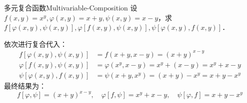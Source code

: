 \begin{problem}{多元复合函数}{Multivariable-Composition}
    设 $f(x, y) = x^y, \varphi(x, y) = x + y, \psi(x, y) = x - y$，求 $f[\varphi(x, y), \psi(x, y)], \varphi[f(x, y), \psi(x, y)], \psi[\varphi(x, y), f(x, y)]$．
\end{problem}

\begin{solution}
    依次进行复合代入：
    \begin{equation}
        \begin{aligned}
            f[\varphi(x, y), \psi(x, y)] & = f(x+y, x-y) = (x+y)^{x-y}                     \\
            \varphi[f(x, y), \psi(x, y)] & = \varphi(x^y, x-y) = x^y + (x-y) = x^y + x - y \\
            \psi[\varphi(x, y), f(x, y)] & = \psi(x+y, x^y) = (x+y) - x^y = x + y - x^y
        \end{aligned}
    \end{equation}
    最终结果为：
    \begin{equation}
        \boxed{f[\varphi, \psi] = (x+y)^{x-y}, \quad \varphi[f, \psi] = x^y + x - y, \quad \psi[\varphi, f] = x + y - x^y}
    \end{equation}
\end{solution}


